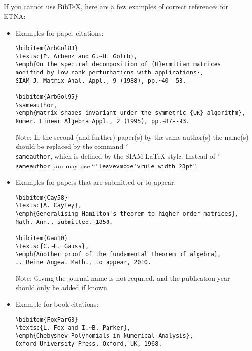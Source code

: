 \documentclass{scrartcl}
\begin{document}
\begin{center}\begin{verbatim}
         
         
\end{verbatim}\end{center}
%
If you cannot use BibTeX, here are a few examples of correct references for
ETNA:

\begin{itemize}
\item Examples for paper citations:

\begin{verbatim}
\bibitem{ArbGol88}
\textsc{P. Arbenz and G.~H. Golub},
\emph{On the spectral decomposition of {H}ermitian matrices
modified by low rank perturbations with applications},
SIAM J. Matrix Anal. Appl., 9 (1988), pp.~40--58.

\bibitem{ArbGol95}
\sameauthor,
\emph{Matrix shapes invariant under the symmetric {QR} algorithm},
Numer. Linear Algebra Appl., 2 (1995), pp.~87--93.
\end{verbatim}
%
Note: In the second (and further) paper(s) by the same author(s) the name(s)
should be replaced by the command \texttt{\char`\\sameauthor}, which is defined
by the SIAM LaTeX style. Instead of \texttt{\char`\\sameauthor} you may use
``\mbox{\texttt{\char`\\leavevmode\char`\\vrule height 2pt depth -1.6pt width
23pt}}''.

\item Examples for papers that are submitted or to appear:

\begin{verbatim}
\bibitem{Cay58}
\textsc{A. Cayley},
\emph{Generalising Hamilton's theorem to higher order matrices},
Math. Ann., submitted, 1858.

\bibitem{Gau10}
\textsc{C.~F. Gauss},
\emph{Another proof of the fundamental theorem of algebra},
J. Reine Angew. Math., to appear, 2010.
\end{verbatim}

Note: Giving the journal name is not required, and the publication year should
only be added if known.

\item Example for book citations:

\begin{verbatim}
\bibitem{FoxPar68}
\textsc{L. Fox and I.~B. Parker},
\emph{Chebyshev Polynomials in Numerical Analysis},
Oxford University Press, Oxford, UK, 1968.
\end{verbatim}


\end{itemize}
\end{document}
